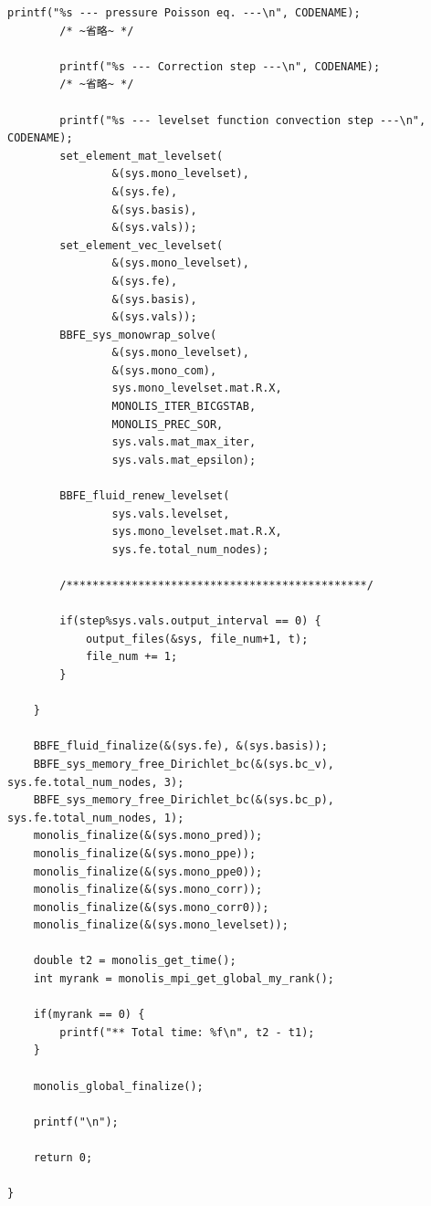 \documentclass[8pt,a4paper]{article}
\begin{document}
\begin{lstlisting}[caption = mlflow\_fs.cのmain関数のレベルセット関数の計算部分抜粋]
		printf("%s --- pressure Poisson eq. ---\n", CODENAME);
		/* ~省略~ */

		printf("%s --- Correction step ---\n", CODENAME);
		/* ~省略~ */
		
		printf("%s --- levelset function convection step ---\n", CODENAME);
		set_element_mat_levelset(
				&(sys.mono_levelset),
				&(sys.fe),
				&(sys.basis),
				&(sys.vals));
		set_element_vec_levelset(
				&(sys.mono_levelset),
				&(sys.fe),
				&(sys.basis),
				&(sys.vals));
		BBFE_sys_monowrap_solve(
				&(sys.mono_levelset),
				&(sys.mono_com),
				sys.mono_levelset.mat.R.X,
				MONOLIS_ITER_BICGSTAB,
				MONOLIS_PREC_SOR,
				sys.vals.mat_max_iter,
				sys.vals.mat_epsilon);

		BBFE_fluid_renew_levelset(
				sys.vals.levelset, 
				sys.mono_levelset.mat.R.X,
				sys.fe.total_num_nodes);

		/**********************************************/

		if(step%sys.vals.output_interval == 0) {
			output_files(&sys, file_num+1, t);
			file_num += 1;
		}

	}

	BBFE_fluid_finalize(&(sys.fe), &(sys.basis));
	BBFE_sys_memory_free_Dirichlet_bc(&(sys.bc_v), sys.fe.total_num_nodes, 3);
	BBFE_sys_memory_free_Dirichlet_bc(&(sys.bc_p), sys.fe.total_num_nodes, 1);
	monolis_finalize(&(sys.mono_pred));
	monolis_finalize(&(sys.mono_ppe));
	monolis_finalize(&(sys.mono_ppe0));
	monolis_finalize(&(sys.mono_corr));
	monolis_finalize(&(sys.mono_corr0));
	monolis_finalize(&(sys.mono_levelset));

	double t2 = monolis_get_time();
	int myrank = monolis_mpi_get_global_my_rank();

	if(myrank == 0) {
		printf("** Total time: %f\n", t2 - t1);
	}

	monolis_global_finalize();

	printf("\n");

	return 0;

}
\end{lstlisting}
\end{document}
